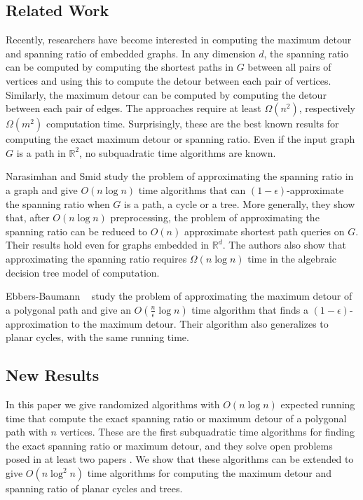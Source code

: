 \documentclass[lotsofwhite]{patmorin}
\begin{document}
\subsection{Related Work}

Recently, researchers have become interested in computing the maximum
detour and spanning ratio of embedded graphs.  In any dimension $d$,
the spanning ratio can be computed by computing the shortest paths in
$G$ between all pairs of vertices and using this to compute the detour
between each pair of vertices.  Similarly, the maximum detour can be
computed by computing the detour between each pair of edges.  The
approaches require at least $\Omega(n^2)$, respectively $\Omega(m^2)$
computation time.  Surprisingly, these are the best known results for
computing the exact maximum detour or spanning ratio.  Even if the
input graph $G$ is a path in $\mathbb{R}^2$, no subquadratic time
algorithms are known.

Narasimhan and Smid \cite{ns01} study the problem of approximating the
spanning ratio in a graph and give $O(n\log n)$ time algorithms that
can $(1-\epsilon)$-approximate the spanning ratio when $G$ is a path,
a cycle or a tree.  More generally, they show that, after $O(n\log n)$
preprocessing, the problem of approximating the spanning ratio can be
reduced to $O(n)$ approximate shortest path queries on $G$.  Their
results hold even for graphs embedded in $\mathbb{R}^d$.  The authors
also show that approximating the spanning ratio requires $\Omega(n\log
n)$ time in the algebraic decision tree model of computation.

Ebbers-Baumann \etal\ \cite{ekll01} study the problem of approximating
the maximum detour of a polygonal path and give an
$O(\frac{n}{\epsilon}\log n)$ time algorithm that finds a
$(1-\epsilon)$-approximation to the maximum detour.  Their algorithm
also generalizes to planar cycles, with the same running time.

\subsection{New Results}

In this paper we give randomized algorithms with $O(n\log n)$ expected
running time that compute the exact spanning ratio or maximum detour
of a polygonal path with $n$ vertices.  These are the first
subquadratic time algorithms for finding the exact spanning ratio or
maximum detour, and they solve open problems posed in at least two
papers \cite{ekll01,ns01}.  We show that these algorithms can be
extended to give $O(n\log^2 n)$ time algorithms for computing the
maximum detour and spanning ratio of planar cycles and trees.
\end{document}
